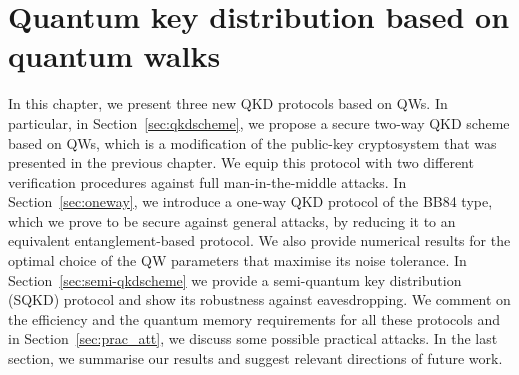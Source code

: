 %
%
%
%
\chapter{Quantum key distribution based on quantum walks}

In this chapter, we present three new QKD protocols based on QWs. In particular, in Section~\ref{sec:qkdscheme}, we propose a secure two-way QKD scheme based on QWs, which is a modification of the public-key cryptosystem that was presented in the previous chapter. We equip this protocol with two different verification procedures against full man-in-the-middle attacks. In Section~\ref{sec:oneway}, we introduce a one-way QKD protocol of the BB84 type, which we prove to be secure against general attacks, by reducing it to an equivalent entanglement-based protocol. We also provide numerical results for the optimal choice of the QW parameters that maximise its noise tolerance. In Section~\ref{sec:semi-qkdscheme} we provide a semi-quantum key distribution (SQKD) protocol and show its robustness against eavesdropping. We comment on the efficiency and the quantum memory requirements for all these protocols and in Section~\ref{sec:prac_att}, we discuss some possible practical attacks. In the last section, we summarise our results and suggest relevant directions of future work.

